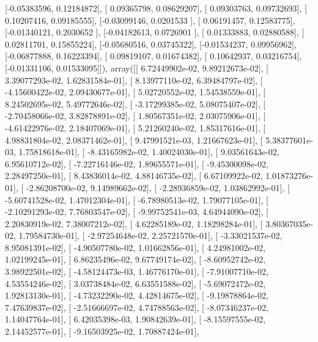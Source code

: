 \documentclass{article}
\begin{document}
       [-0.05383596,  0.12184872],
       [ 0.09365798,  0.08629207],
       [ 0.09303763,  0.09732693],
       [ 0.10207416,  0.09185555],
       [-0.03099146,  0.0201533 ],
       [ 0.06191457,  0.12583775],
       [-0.01340121,  0.2030652 ],
       [-0.04182613,  0.0726901 ],
       [ 0.01333883,  0.02880588],
       [ 0.02811701,  0.15855224],
       [-0.05680516,  0.03745322],
       [-0.01534237,  0.09956962],
       [-0.06877888,  0.16223394],
       [ 0.09819107,  0.01674382],
       [ 0.10642937,  0.03216754],
       [-0.01331106,  0.01533095]]), array([[  6.72449902e-02,   9.89212673e-02],
       [  3.39077293e-02,   1.62831584e-01],
       [  8.13977110e-02,   6.39484797e-02],
       [ -4.15600422e-02,   2.09430677e-01],
       [  5.02720552e-02,   1.54538559e-01],
       [  8.24502695e-02,   5.49772646e-02],
       [ -3.17299385e-02,   5.08075407e-02],
       [ -2.70458066e-02,   3.82878891e-02],
       [  1.80567351e-02,   2.03075906e-01],
       [ -4.61422976e-02,   2.18407069e-01],
       [  5.21260240e-02,   1.85317616e-01],
       [  4.98831804e-02,   2.08371462e-01],
       [  9.47991521e-03,   1.21667623e-01],
       [  5.38377601e-03,   1.75818618e-01],
       [ -8.43165982e-02,   1.40024030e-01],
       [  9.03561643e-02,   6.95610712e-02],
       [ -7.22716146e-02,   1.89655571e-01],
       [ -9.45300098e-02,   2.28497250e-01],
       [  8.43836014e-02,   4.88146735e-02],
       [  6.67109922e-02,   1.01873276e-01],
       [ -2.86208700e-02,   9.14989662e-02],
       [ -2.28936859e-02,   1.03862992e-01],
       [ -5.60741528e-02,   1.47012304e-01],
       [ -6.78980513e-02,   1.79077105e-01],
       [ -2.10291293e-02,   7.76803547e-02],
       [ -9.99752541e-03,   4.64944090e-02],
       [  2.20830919e-02,   7.38007212e-02],
       [  4.62285189e-02,   1.18298284e-01],
       [  3.80367035e-02,   1.79584730e-01],
       [ -2.97254648e-02,   2.25721570e-01],
       [ -3.33021537e-02,   8.95081391e-02],
       [ -4.90507780e-02,   1.01662856e-01],
       [  4.24981002e-02,   1.02199245e-01],
       [  6.86235496e-02,   9.67749174e-02],
       [ -8.60952742e-02,   3.98922501e-02],
       [ -4.58124473e-03,   1.46776170e-01],
       [ -7.91007710e-02,   4.53554246e-02],
       [  3.03738484e-02,   6.63551588e-02],
       [ -5.69072472e-02,   1.92813130e-01],
       [ -4.73232290e-02,   4.42814675e-02],
       [ -9.19878864e-02,   7.47639837e-02],
       [ -2.51666697e-02,   4.74788563e-02],
       [ -8.07346237e-02,   1.14047764e-01],
       [  6.42035398e-03,   1.90842639e-01],
       [ -8.15597555e-02,   2.14452577e-01],
       [ -9.16503925e-02,   1.70887424e-01],
\end{document}
